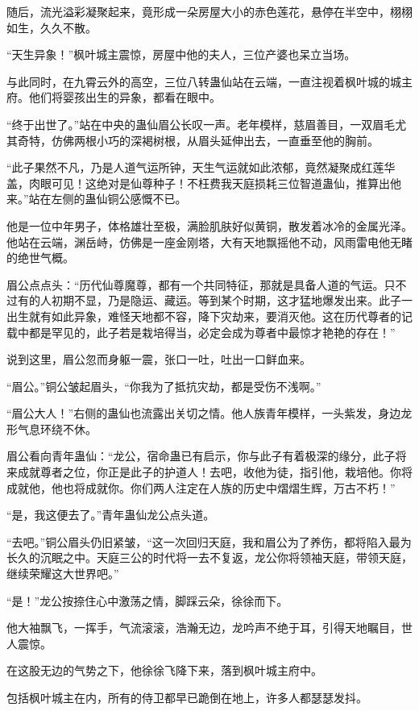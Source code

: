 \begin{this_body}
随后，流光溢彩凝聚起来，竟形成一朵房屋大小的赤色莲花，悬停在半空中，栩栩如生，久久不散。

“天生异象！”枫叶城主震惊，房屋中他的夫人，三位产婆也呆立当场。

与此同时，在九霄云外的高空，三位八转蛊仙站在云端，一直注视着枫叶城的城主府。他们将婴孩出生的异象，都看在眼中。

“终于出世了。”站在中央的蛊仙眉公长叹一声。老年模样，慈眉善目，一双眉毛尤其奇特，仿佛两根小巧的深褐树根，从眉头延伸出去，一直垂至他的胸前。

“此子果然不凡，乃是人道气运所钟，天生气运就如此浓郁，竟然凝聚成红莲华盖，肉眼可见！这绝对是仙尊种子！不枉费我天庭损耗三位智道蛊仙，推算出他来。”站在左侧的蛊仙铜公感慨不已。

他是一位中年男子，体格雄壮至极，满脸肌肤好似黄铜，散发着冰冷的金属光泽。他站在云端，渊岳峙，仿佛是一座金刚塔，大有天地飘摇他不动，风雨雷电他无睹的绝世气概。

眉公点点头：“历代仙尊魔尊，都有一个共同特征，那就是具备人道的气运。只不过有的人初期不显，乃是隐运、藏运。等到某个时期，这才猛地爆发出来。此子一出生就有如此异象，难怪天地都不容，降下灾劫来，要消灭他。这在历代尊者的记载中都是罕见的，此子若是栽培得当，必定会成为尊者中最惊才艳艳的存在！”

说到这里，眉公忽而身躯一震，张口一吐，吐出一口鲜血来。

“眉公。”铜公皱起眉头，“你我为了抵抗灾劫，都是受伤不浅啊。”

“眉公大人！”右侧的蛊仙也流露出关切之情。他人族青年模样，一头紫发，身边龙形气息环绕不休。

眉公看向青年蛊仙：“龙公，宿命蛊已有启示，你与此子有着极深的缘分，此子将来成就尊者之位，你正是此子的护道人！去吧，收他为徒，指引他，栽培他。你将成就他，他也将成就你。你们两人注定在人族的历史中熠熠生辉，万古不朽！”

“是，我这便去了。”青年蛊仙龙公点头道。

“去吧。”铜公眉头仍旧紧皱，“这一次回归天庭，我和眉公为了养伤，都将陷入最为长久的沉眠之中。天庭三公的时代将一去不复返，龙公你将领袖天庭，带领天庭，继续荣耀这大世界吧。”

“是！”龙公按捺住心中激荡之情，脚踩云朵，徐徐而下。

他大袖飘飞，一挥手，气流滚滚，浩瀚无边，龙吟声不绝于耳，引得天地瞩目，世人震惊。

在这股无边的气势之下，他徐徐飞降下来，落到枫叶城主府中。

包括枫叶城主在内，所有的侍卫都早已跪倒在地上，许多人都瑟瑟发抖。


\end{this_body}
